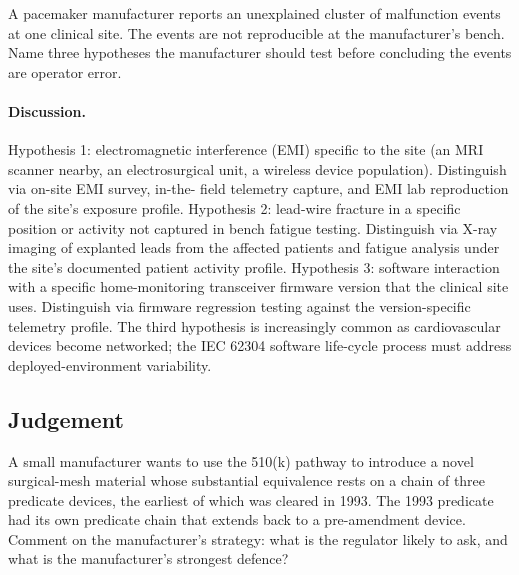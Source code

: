 \begin{exercise}
A pacemaker manufacturer reports an unexplained cluster of
malfunction events at one clinical site. The events are not
reproducible at the manufacturer's bench. Name three hypotheses
the manufacturer should test before concluding the events are
operator error.
\end{exercise}

\paragraph{Discussion.}
Hypothesis 1: electromagnetic interference (EMI) specific to the
site (an MRI scanner nearby, an electrosurgical unit, a wireless
device population). Distinguish via on-site EMI survey, in-the-
field telemetry capture, and EMI lab reproduction of the site's
exposure profile. Hypothesis 2: lead-wire fracture in a specific
position or activity not captured in bench fatigue testing.
Distinguish via X-ray imaging of explanted leads from the affected
patients and fatigue analysis under the site's documented patient
activity profile. Hypothesis 3: software interaction with a
specific home-monitoring transceiver firmware version that the
clinical site uses. Distinguish via firmware regression testing
against the version-specific telemetry profile. The third
hypothesis is increasingly common as cardiovascular devices become
networked; the IEC 62304 software life-cycle process must address
deployed-environment variability.

\subsection*{Judgement}

\begin{exercise}
A small manufacturer wants to use the 510(k) pathway to introduce
a novel surgical-mesh material whose substantial equivalence rests
on a chain of three predicate devices, the earliest of which was
cleared in 1993. The 1993 predicate had its own predicate chain
that extends back to a pre-amendment device. Comment on the
manufacturer's strategy: what is the regulator likely to ask, and
what is the manufacturer's strongest defence?
\end{exercise}

